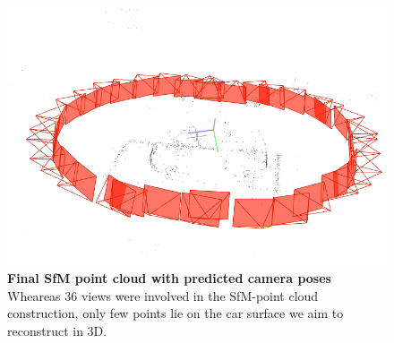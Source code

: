 \begin{figure}[htbp!]
    \center
  \includegraphics[width=.8\linewidth]{images/gaussiansplatting/colmap_sparsePC.png}
  \caption{\textbf{Final SfM point cloud with predicted camera poses} Wheareas 36 views were involved in the \ac{SfM}-point cloud construction, only few points lie on the car surface we aim to reconstruct in 3D.}
  \label{fig:sfm-colmap-pc}
\end{figure}

